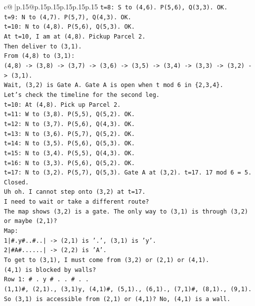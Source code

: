 \documentclass{article}
\begin{document}
{\begin{supertabular}{c@{$\;$}|p{.15\linewidth}@{}p{.15\linewidth}p{.15\linewidth}p{.15\linewidth}p{.15\linewidth}p{.15\linewidth}}
{{{\texttt{t=8: S to (4,6). P(5,6), Q(3,3). OK.} \\
\texttt{t=9: N to (4,7). P(5,7), Q(4,3). OK.} \\
\texttt{t=10: N to (4,8). P(5,6), Q(5,3). OK.} \\
\texttt{At t=10, I am at (4,8). Pickup Parcel 2.} \\
\texttt{Then deliver to (3,1).} \\
\texttt{From (4,8) to (3,1):} \\
\texttt{(4,8) {-}> (3,8) {-}> (3,7) {-}> (3,6) {-}> (3,5) {-}> (3,4) {-}> (3,3) {-}> (3,2) {-}> (3,1).} \\
\texttt{Wait, (3,2) is Gate A. Gate A is open when t mod 6 in \{2,3,4\}.} \\
\texttt{Let's check the timeline for the second leg.} \\
\texttt{t=10: At (4,8). Pick up Parcel 2.} \\
\texttt{t=11: W to (3,8). P(5,5), Q(5,2). OK.} \\
\texttt{t=12: N to (3,7). P(5,6), Q(4,3). OK.} \\
\texttt{t=13: N to (3,6). P(5,7), Q(5,2). OK.} \\
\texttt{t=14: N to (3,5). P(5,6), Q(5,3). OK.} \\
\texttt{t=15: N to (3,4). P(5,5), Q(4,3). OK.} \\
\texttt{t=16: N to (3,3). P(5,6), Q(5,2). OK.} \\
\texttt{t=17: N to (3,2). P(5,7), Q(5,3). Gate A at (3,2). t=17. 17 mod 6 = 5. Closed.} \\
\texttt{Uh oh. I cannot step onto (3,2) at t=17.} \\
\texttt{I need to wait or take a different route?} \\
\texttt{The map shows (3,2) is a gate. The only way to (3,1) is through (3,2) or maybe (2,1)?} \\
\texttt{Map:} \\
\texttt{1|\#.y\#..\#..| {-}> (2,1) is '.', (3,1) is 'y'.} \\
\texttt{2|\#A\#......| {-}> (2,2) is 'A'.} \\
\texttt{To get to (3,1), I must come from (3,2) or (2,1) or (4,1).} \\
\texttt{(4,1) is blocked by walls?} \\
\texttt{Row 1: \# . y \# . . \# . .} \\
\texttt{(1,1)\#, (2,1)., (3,1)y, (4,1)\#, (5,1)., (6,1)., (7,1)\#, (8,1)., (9,1).} \\
\texttt{So (3,1) is accessible from (2,1) or (4,1)? No, (4,1) is a wall.} \\
}}}
\end{supertabular}}
\end{document}
